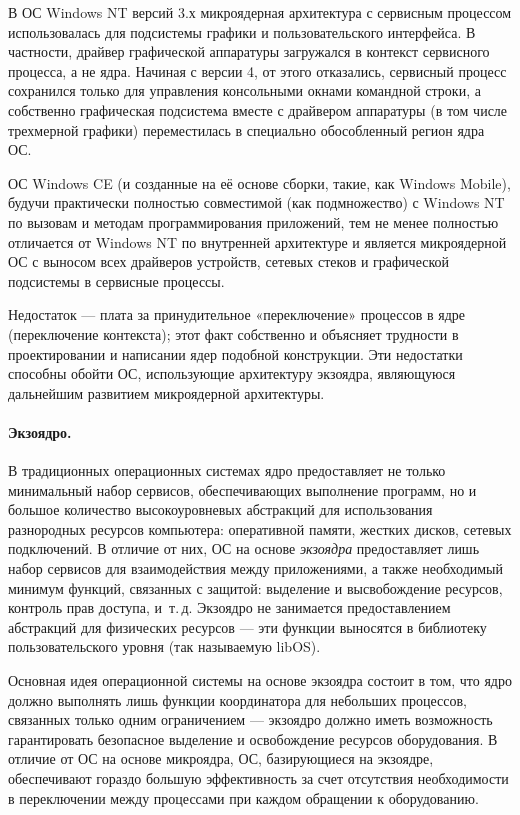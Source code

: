 В ОС Windows NT версий 3.х микроядерная архитектура с сервисным процессом использовалась для подсистемы графики и пользовательского интерфейса. В частности, драйвер графической аппаратуры загружался в контекст сервисного процесса, а не ядра.
Начиная с версии 4, от этого отказались, сервисный процесс сохранился только для управления консольными окнами командной строки, а собственно графическая подсистема вместе с драйвером аппаратуры (в том числе трехмерной графики) переместилась в специально обособленный регион ядра ОС.

ОС Windows CE (и созданные на её основе сборки, такие, как Windows Mobile), будучи практически полностью совместимой (как подмножество) с Windows NT по вызовам и методам программирования приложений, тем не менее полностью отличается от Windows NT по внутренней архитектуре и является микроядерной ОС с выносом всех драйверов устройств, сетевых стеков и графической подсистемы в сервисные процессы.

Недостаток --- плата за принудительное «переключение» процессов в ядре (переключение контекста); этот факт собственно и объясняет трудности в проектировании и написании ядер подобной конструкции. Эти недостатки способны обойти ОС, использующие архитектуру экзоядра, являющуюся дальнейшим развитием микроядерной архитектуры.

\paragraph{Экзоядро.}\label{base:os:structure:kernel:types:exokernel} В традиционных операционных системах ядро предоставляет не только минимальный набор сервисов, обеспечивающих выполнение программ, но и большое количество высокоуровневых абстракций для использования разнородных ресурсов компьютера: оперативной памяти, жестких дисков, сетевых подключений.
В отличие от них, ОС на основе \emph{экзоядра} предоставляет лишь набор сервисов для взаимодействия между приложениями, а также необходимый минимум функций, связанных с защитой: выделение и высвобождение ресурсов, контроль прав доступа, и~т.\,д. Экзоядро не занимается предоставлением абстракций для физических ресурсов --- эти функции выносятся в библиотеку пользовательского уровня (так называемую libOS).

Основная идея операционной системы на основе экзоядра состоит в том, что ядро должно выполнять лишь функции координатора для небольших процессов, связанных только одним ограничением --- экзоядро должно иметь возможность гарантировать безопасное выделение и освобождение ресурсов оборудования.
В отличие от ОС на основе микроядра, ОС, базирующиеся на экзоядре, обеспечивают гораздо большую эффективность за счет отсутствия необходимости в переключении между процессами при каждом обращении к оборудованию.

